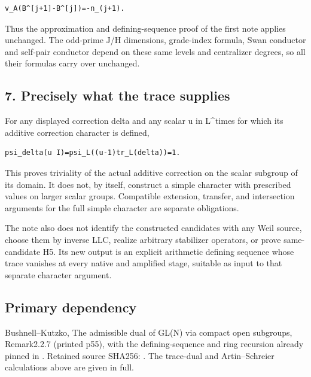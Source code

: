 \begin{Verbatim}[fontsize=\small,breaklines=true,breakanywhere=true]
v_A(B^[j+1]-B^[j])=-n_(j+1).
\end{Verbatim}

Thus the approximation and defining-sequence proof of the first note
applies unchanged. The odd-prime J/H dimensions, grade-index formula,
Swan conductor and self-pair conductor depend on these same levels and
centralizer degrees, so all their formulas carry over unchanged.

\hypertarget{odd_tower-precisely-what-the-trace-supplies}{%
\subsection{7. Precisely what the trace
supplies}\label{odd_tower-precisely-what-the-trace-supplies}}

For any displayed correction delta and any scalar u in L\^{}times for
which its additive correction character is defined,

\begin{Verbatim}[fontsize=\small,breaklines=true,breakanywhere=true]
psi_delta(u I)=psi_L((u-1)tr_L(delta))=1.
\end{Verbatim}

This proves triviality of the actual additive correction on the scalar
subgroup of its domain. It does not, by itself, construct a simple
character with prescribed values on larger scalar groups. Compatible
extension, transfer, and intersection arguments for the full simple
character are separate obligations.

The note also does not identify the constructed candidates with any Weil
source, choose them by inverse LLC, realize arbitrary stabilizer
operators, or prove same-candidate H5. Its new output is an explicit
arithmetic defining sequence whose trace vanishes at every native and
amplified stage, suitable as input to that separate character argument.

\hypertarget{odd_tower-primary-dependency}{%
\subsection{Primary dependency}\label{odd_tower-primary-dependency}}

Bushnell--Kutzko, The admissible dual of GL(N) via compact open
subgroups, Remark2.2.7 (printed p55), with the defining-sequence and
ring recursion already pinned in . Retained source
SHA256:
. The
trace-dual and Artin--Schreier calculations above are given in full.
